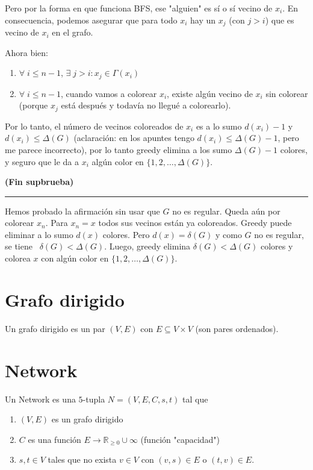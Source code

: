 \documentclass[10pt,a4paper]{article}
\begin{document}
Pero por la forma en que funciona BFS, ese "alguien" es sí o sí vecino de $x_i$. En consecuencia, podemos asegurar que para todo $x_i$ hay un $x_j$ (con $j > i$) que es vecino de $x_i$ en el grafo.

Ahora bien:

\begin{enumerate}

	\item $\forall \; i \leq n-1$, $\exists\;j>i:x_j \in \Gamma(x_i)$
	\item $\forall \; i \leq n-1$, cuando vamos a colorear $x_i$, existe algún vecino de $x_i$ sin colorear (porque $x_j$ está después y todavía no llegué a colorearlo).
\end{enumerate}

Por lo tanto, el número de vecinos coloreados de $x_i$ es a lo sumo $d(x_i) -1$ y $d(x_i) \leq \Delta(G)$ (aclaración: en los apuntes tengo $d(x_i) \leq \Delta(G) -1$, pero me parece incorrecto), por lo tanto greedy elimina a los sumo $\Delta(G) - 1$ colores, y seguro que le da a $x_i$ algún color en $\{1,2,\dots, \Delta(G)\}$.

\textbf{(Fin supbrueba)}

\vspace{0.5cm}\hrule\vspace{0.5cm}
Hemos probado la afirmación sin usar que $G$ no es regular. Queda aún por colorear $x_n$. Para $x_n=x$ todos sus vecinos están ya coloreados. Greedy puede eliminar a lo sumo $d(x)$ colores. Pero $d(x) = \delta(G)$ y como $G$ no es regular, se tiene  $\delta(G) < \Delta(G)$. Luego, greedy elimina $\delta(G)<\Delta(G)$ colores y colorea $x$ con algún color en $\{1, 2, \dots, \Delta(G)\}$.

\section*{Grafo dirigido}

Un grafo dirigido es un par $(V, E)$ con $E \subseteq V \times V$ (son pares ordenados).

\section*{Network}

Un Network es una $5$-tupla $N = (V, E, C, s, t)$ tal que

\begin{enumerate}

	\item $(V, E)$ es un grafo dirigido
	\item $C$ es una función $E \rightarrow \mathbb{R}_{\geq0} \cup \infty$ (función "capacidad")
	\item $s, t \in V$ tales que no exista $v\in V$ con $(v, s) \in E$ o $(t,v)\in E$.
\end{enumerate}
\end{document}
